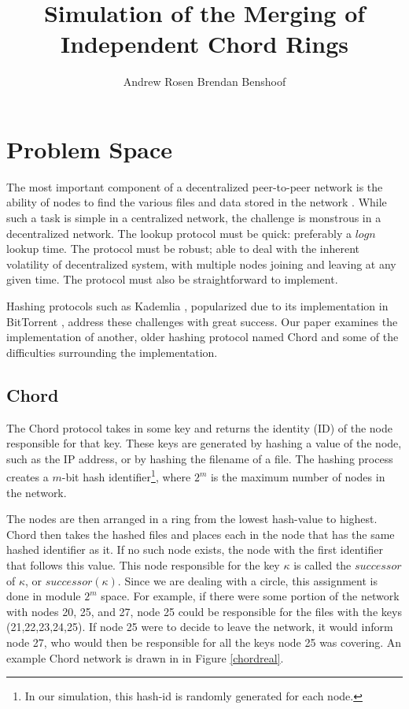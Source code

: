 \documentclass[12pt]{ieeetran} %
\title{Simulation of the Merging of Independent Chord Rings}
\author{Andrew Rosen \qquad Brendan Benshoof }
\date{} %
\begin{document}
\maketitle
\newpage
\section{Problem Space}

The most important component of a decentralized peer-to-peer network is the ability of nodes to find the various files and data stored in the network \cite{Chord}.  While such a task is simple in a centralized network, the challenge is monstrous in a decentralized network.  The lookup protocol must be quick:  preferably a $log n$ lookup time.  The protocol must be robust; able to deal with the inherent volatility of decentralized system, with multiple nodes joining and leaving at any given time.  The protocol must also be straightforward to implement.

Hashing protocols such as Kademlia \cite{Kademlia}, popularized due to its implementation in BitTorrent \cite{BitTorrent}, address these challenges with great success.  Our paper examines the implementation of another, older hashing protocol named Chord \cite{Chord} and some of the difficulties surrounding the implementation.
\subsection{Chord}

The Chord protocol \cite{Chord} takes in some key and returns the identity (ID) of the node responsible for that key.  These keys are generated by hashing a value of the node, such as the IP address, or by hashing  the filename of a file.  The hashing process creates a $m$-bit hash identifier\footnote{In our simulation, this hash-id is randomly generated for each node.}, where $2^m$ is the maximum number of nodes in the network.

The nodes are then arranged in a ring from the lowest hash-value to highest.  Chord then takes the hashed files and places each in the node that has the same hashed identifier as it.  If no such node exists, the node with the first identifier that follows this value.  This node responsible for the key $\kappa$ is called the $successor$ of $\kappa$, or $successor(\kappa)$.  Since we are dealing with a circle, this assignment is done in module $2^m$ space.  For example, if there were some portion of the network with nodes 20, 25, and 27, node 25 could be responsible for the files with the keys (21,22,23,24,25). If node 25 were to decide to leave the network, it would inform node 27, who would then be responsible for all the keys node 25 was covering. An example Chord network is drawn in in Figure \ref{chordreal}.
\end{document}
